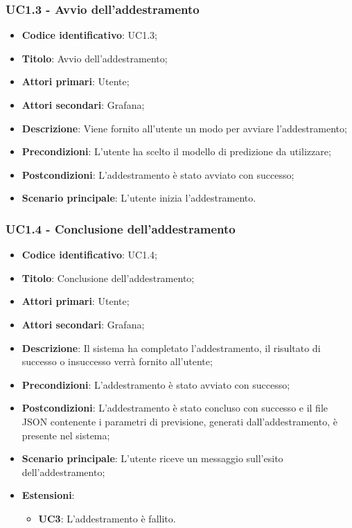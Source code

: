 	\subsubsection{UC1.3 - Avvio dell'addestramento}
	\begin{itemize}
		\item \textbf{Codice identificativo}: UC1.3;
		\item \textbf{Titolo}: Avvio dell'addestramento;
		\item \textbf{Attori primari}: Utente;
		\item \textbf{Attori secondari}: Grafana\glo;
		\item \textbf{Descrizione}: Viene fornito all'utente un modo per avviare l'addestramento;
		\item \textbf{Precondizioni}: L'utente ha scelto il modello di predizione da utilizzare;
		\item \textbf{Postcondizioni}: L'addestramento è stato avviato con successo;
		\item \textbf{Scenario principale}: L'utente inizia l'addestramento.
	\end{itemize}

	\subsubsection{UC1.4 - Conclusione dell'addestramento}
	\begin{itemize}
		\item \textbf{Codice identificativo}: UC1.4;
		\item \textbf{Titolo}: Conclusione dell'addestramento;
		\item \textbf{Attori primari}: Utente;
		\item \textbf{Attori secondari}: Grafana\glo;
		\item \textbf{Descrizione}: Il sistema ha completato l'addestramento, il risultato di successo o insuccesso verrà fornito all'utente;
		\item \textbf{Precondizioni}: L'addestramento è stato avviato con successo;
		\item \textbf{Postcondizioni}: L'addestramento è stato concluso con successo e il file JSON contenente i parametri di previsione, generati dall'addestramento, è presente nel sistema;
		\item \textbf{Scenario principale}: L'utente riceve un messaggio sull'esito dell'addestramento;
		\item \textbf{Estensioni}:
			\begin{itemize}
				\item \textbf{UC3}: L'addestramento è fallito.
			\end{itemize}
		
	\end{itemize}

